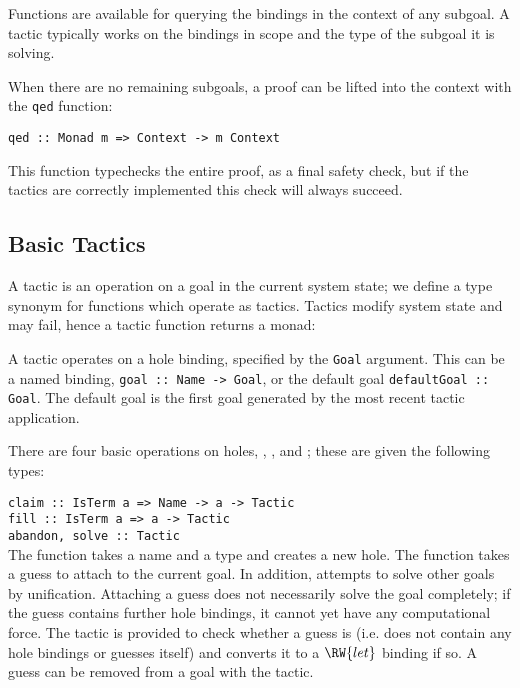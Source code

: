 Functions are available for querying the bindings in the context of
any subgoal. A tactic typically works on the bindings in scope and the
type of the subgoal it is solving.

When there are no remaining subgoals, a proof can be lifted into the
context with the \texttt{qed} function:

\verb+qed :: Monad m => Context -> m Context+

This function typechecks the entire proof, as a final safety check,
but if the tactics are correctly implemented this check will always succeed.

\subsection{Basic Tactics}

A tactic is an operation on a goal in the current system state; we
define a type synonym  for functions which operate as
tactics. Tactics modify system state and may fail, hence a tactic
function returns a monad:


A tactic operates on a hole binding, specified by the \texttt{Goal}
argument. This can be a named binding, \texttt{goal :: Name -> Goal},
or the default goal \texttt{defaultGoal :: Goal}. The default goal is
the first goal generated by the most recent tactic application.

There are four basic operations on holes, , ,
 and ; these are given the following types:

\verb+claim :: IsTerm a => Name -> a -> Tactic+\\
\verb+fill :: IsTerm a => a -> Tactic+\\
\verb+abandon, solve :: Tactic+\\

The  function takes a name and a type and creates a new
hole. The  function takes a guess to attach to the current
goal. In addition,  attempts to solve other goals by
unification. Attaching a guess does not necessarily solve the goal
completely; if the guess contains further hole bindings, it cannot yet
have any computational force. The  tactic is provided to
check whether a guess is  (i.e. does not contain any hole
bindings or guesses itself) and converts it to a $\RW{let}$ binding if
so.  A guess can be removed from a goal with the 
tactic.

